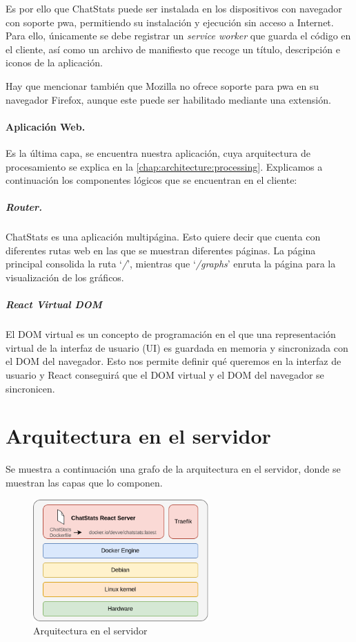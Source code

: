 Es por ello que ChatStats puede ser instalada en los dispositivos con navegador con soporte \acrshort{pwa}, permitiendo su instalación y ejecución sin acceso a Internet. Para ello, únicamente se debe registrar un \textit{service worker} que guarda el código en el cliente, así como un archivo de manifiesto que recoge un título, descripción e iconos de la aplicación.

Hay que mencionar también que Mozilla no ofrece soporte para \acrshort{pwa} en su navegador Firefox\cite{firefoxNoPWA}, aunque este puede ser habilitado mediante una extensión\cite{firefoxPWAextension}.

\paragraph{Aplicación Web.} Es la última capa, se encuentra nuestra aplicación, cuya arquitectura de procesamiento se explica en la \autoref{chap:architecture:processing}. Explicamos a continuación los componentes lógicos que se encuentran en el cliente:

\subparagraph{Router.} ChatStats es una aplicación multipágina. Esto quiere decir que cuenta con diferentes rutas web en las que se muestran diferentes páginas. La página principal consolida la ruta `\textit{/}', mientras que `\textit{/graphs}' enruta la página para la visualización de los gráficos.

\subparagraph{React Virtual DOM} El DOM virtual es un concepto de programación en el que una representación virtual de la interfaz de usuario (UI) es guardada en memoria y sincronizada con el DOM del navegador. Esto nos permite definir qué queremos en la interfaz de usuario y React conseguirá que el DOM virtual y el DOM del navegador se sincronicen.








\section{Arquitectura en el servidor}
\label{chap:architecture:server}

Se muestra a continuación una grafo de la arquitectura en el servidor, donde se muestran las capas que lo componen.

\begin{figure}[H]
	\centering
	\includegraphics[width=0.6\textwidth]{img/server.png}
	\caption{Arquitectura en el servidor}
	\label{fig:chap4:architecture_server}
\end{figure}

